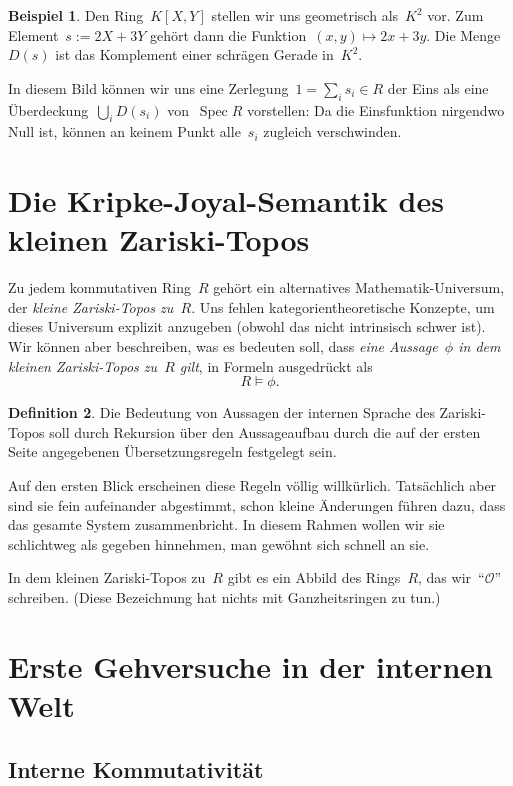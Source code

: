 \documentclass[a4paper,ngerman,12pt]{scrartcl}
\theoremstyle{definition}
\newtheorem{defn}{Definition}[section]
\newtheorem{bsp}[defn]{Beispiel}
\theoremstyle{plain}
\theoremstyle{remark}
\renewcommand{\O}{\mathcal{O}}
\DeclareMathOperator{\Spec}{Spec}
\renewcommand{\_}{\mathpunct{.}\,}
\newcommand{\?}{\,{:}\,}
\begin{document}
\begin{bsp}Den Ring~$K[X,Y]$ stellen wir uns geometrisch als~$K^2$ vor. Zum
Element~$s := 2X+3Y$ gehört dann die Funktion~$(x,y) \mapsto 2x+3y$. Die
Menge~$D(s)$ ist das Komplement einer schrägen Gerade in~$K^2$.\end{bsp}

In diesem Bild können wir uns eine Zerlegung~$1 = \sum_i s_i \in R$ der Eins
als eine Über\-dec\-kung~$\bigcup_i D(s_i)$ von~$\Spec R$ vorstellen: Da die
Einsfunktion nirgendwo Null ist, können an keinem Punkt alle~$s_i$ zugleich
verschwinden.


\section{Die Kripke-Joyal-Semantik des kleinen Zariski-Topos}

Zu jedem kommutativen Ring~$R$ gehört ein alternatives Mathematik-Universum,
der \emph{kleine Zariski-Topos zu~$R$}. Uns fehlen kategorientheoretische
Konzepte, um dieses Universum explizit anzugeben (obwohl das nicht intrinsisch
schwer ist). Wir können aber beschreiben, was es bedeuten soll, dass \emph{eine
Aussage~$\phi$ in dem kleinen Zariski-Topos zu~$R$ gilt}, in Formeln
ausgedrückt als
\[ R \models \phi. \]

\begin{defn}Die Bedeutung von Aussagen der internen Sprache des Zariski-Topos
soll durch Rekursion über den Aussageaufbau durch die auf der ersten Seite
angegebenen Übersetzungsregeln festgelegt sein.\end{defn}

Auf den ersten Blick erscheinen diese Regeln völlig
willkürlich. Tatsächlich aber sind sie fein aufeinander abgestimmt, schon
kleine Änderungen führen dazu, dass das gesamte System zusammenbricht. In
diesem Rahmen wollen wir sie schlichtweg als gegeben hinnehmen, man gewöhnt
sich schnell an sie.

In dem kleinen Zariski-Topos zu~$R$ gibt es ein Abbild des Rings~$R$, das
wir~"`$\O$"' schreiben. (Diese Bezeichnung hat nichts mit Ganzheitsringen zu tun.)


\section{Erste Gehversuche in der internen Welt}

\subsection{Interne Kommutativität}
\end{document}
